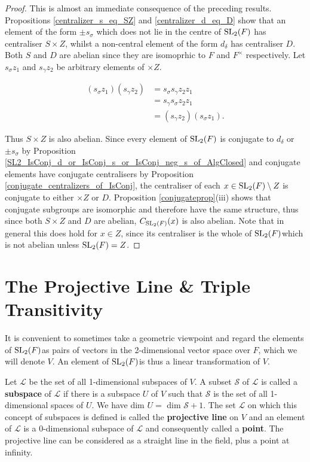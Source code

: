 \begin{proof} This is almost an immediate consequence of the preceding results. Propositions \ref{centralizer_s_eq_SZ} and \ref{centralizer_d_eq_D} show that an element of the form $\pm s_\sigma$ which does not lie in the centre of $\operatorname{SL}_2(F)$ has centraliser $S \times Z$, whilst a non-central element of the form $d_\delta$ has centraliser $D$.
Both $S$ and $D$ are abelian since they are isomoprhic to $F$ and $F^\times$ respectively. Let $s_\sigma z_1$ and $s_\gamma z_2$  be arbitrary elements of $\times Z$.

\vspace{-.5mm}
\begin{align*} 
    (s_\sigma z_1)(s_\gamma z_2)  &= s_\sigma s_\gamma z_2 z_1  \tag{since  $z_1 \in Z$}
\\ &= s_\gamma s_\sigma z_2 z_1  \tag{since  $T$ is abelian}
\\ &= (s_\gamma z_2)(s_\sigma z_1).   \tag{since  $z_2 \in Z$}
\end{align*} 

Thus $S \times Z$ is also abelian. Since every element of $\operatorname{SL}_2(F)$ is conjugate to $d_\delta$ or $\pm s_\sigma$ by Proposition \ref{SL2_IsConj_d_or_IsConj_s_or_IsConj_neg_s_of_AlgClosed} and conjugate elements have conjugate centralisers by Proposition \ref{conjugate_centralizers_of_IsConj}, the centraliser of each $x \in \operatorname{SL}_2(F)\setminus Z$ is conjugate to either $\times Z$ or $D$. 
Proposition \ref{conjugateprop}(iii) shows that conjugate subgroups are isomorphic and therefore have the same structure, thus since both $S \times Z$ and $D$ are abelian, $C_{\operatorname{SL}_2(F)}(x)$ is also abelian. 
Note that in general this does hold for $x \in Z$, since its centraliser is the whole of $\operatorname{SL}_2(F)$which is not abelian unless $\operatorname{SL}_2(F)= Z$.

\end{proof}



\section{The Projective Line \& Triple Transitivity}

It is convenient to sometimes take a geometric viewpoint and regard the elements of $\operatorname{SL}_2(F)$as pairs of vectors in the 2-dimensional vector space over $F$, which we will denote $V$. An element of $\operatorname{SL}_2(F)$is thus a linear transformation of $V$. 

\begin{definition} Let $\mathscr{L}$ be the set of all 1-dimensional subspaces of $V$. A subset $\mathscr{S}$ of $\mathscr{L}$ is called a \textbf{subspace} of $\mathscr{L}$ if there is a subspace $U$ of $V$ such that $\mathscr{S}$ is the set of all 1-dimensional spaces of $U$. We have dim $U =$ dim $\mathscr{S} + 1$. The set $\mathscr{L}$ on which this concept of subspaces is defined is called the \textbf{projective line} on $V$ and an element of $\mathscr{L}$ is a 0-dimensional subspace of $\mathscr{L}$ and consequently called a \textbf{point}. The projective line can be considered as a straight line in the field, plus a point at infinity.
\end{definition}

